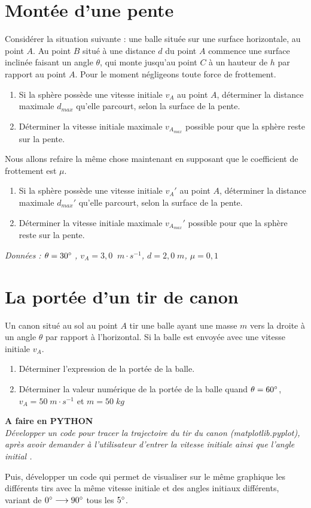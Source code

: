 \documentclass[11pt,a4paper]{article}
\newcommand{\To}{\longrightarrow}
\newcommand{\mps}{\; m\cdot s^{-1}}
\newenvironment{python}
 {\begin{shaded} \textbf{A faire en PYTHON}\\ \itshape } { \end{shaded}}
\begin{document}
\section{Montée d'une pente}
Considérer la situation suivante : une balle située sur une surface horizontale, au point $A$. Au point $B$ situé à une distance $d$ du point $A$ commence une surface inclinée faisant un angle $\theta$, qui monte jusqu'au point $C$ à un hauteur de $h$ par rapport au point $A$. 
Pour le moment négligeons toute force de frottement. 
\begin{enumerate}
    \item Si la sphère possède une vitesse initiale $v_A$ au point $A$, déterminer la distance maximale $d_{max}$ qu'elle parcourt, selon la surface de la pente. 
    \item Déterminer la vitesse initiale maximale $v_{A_{max}}$ possible pour que la sphère reste sur la pente. 
    \end{enumerate}
Nous allons refaire la même chose maintenant en supposant que le coefficient de frottement est $\mu$.
\begin{enumerate}[resume]
    \item Si la sphère possède une vitesse initiale $v_A'$ au point $A$, déterminer la distance maximale $d_{max}'$ qu'elle parcourt, selon la surface de la pente. 
    \item Déterminer la vitesse initiale maximale $v_{A_{max}}'$ possible pour que la sphère reste sur la pente. 
\end{enumerate}

\textit{Données : $\theta=30\degree\;$, $v_A = 3,0\; \mps$, $d=2,0\; m$, $\mu=0,1$}


\section{La portée d'un tir de canon}
Un canon situé au sol au point $A$ tir une balle ayant une masse $m$ vers la droite à un angle $\theta$ par rapport à l'horizontal. Si la balle est envoyée avec une vitesse initiale $v_A$. 
\begin{enumerate}
    \item Déterminer l'expression de la portée de la balle. 
    \item Déterminer la valeur numérique de la portée de la balle quand $\theta=60\degree$, $v_A=50 \mps$ et $m=50\; kg$
    
\end{enumerate}

\begin{python}
Développer un code pour tracer la trajectoire du tir du canon (matplotlib.pyplot), après avoir demander à l'utilisateur d'entrer la vitesse initiale ainsi que l'angle initial . 

Puis, développer un code qui permet de visualiser sur le même graphique les différents tirs avec la même vitesse initiale et des angles initiaux différents, variant de $0\degree \To 90\degree$ tous les $5\degree$.  
\end{python}
\end{document}
